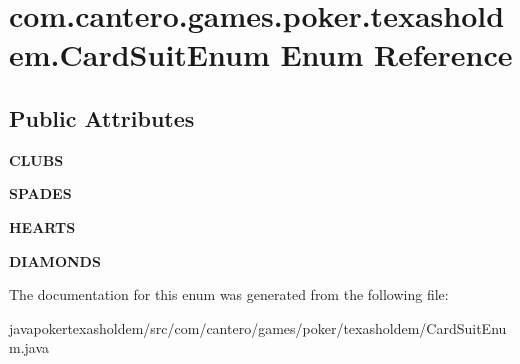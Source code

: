 \hypertarget{enumcom_1_1cantero_1_1games_1_1poker_1_1texasholdem_1_1_card_suit_enum}{}\section{com.\+cantero.\+games.\+poker.\+texasholdem.\+Card\+Suit\+Enum Enum Reference}
\label{enumcom_1_1cantero_1_1games_1_1poker_1_1texasholdem_1_1_card_suit_enum}
\subsection*{Public Attributes}
\begin{DoxyCompactItemize}
\item 
\hypertarget{enumcom_1_1cantero_1_1games_1_1poker_1_1texasholdem_1_1_card_suit_enum_a48741b60994b85639f3da269e31109d2}{}{\bfseries C\+L\+U\+B\+S}\label{enumcom_1_1cantero_1_1games_1_1poker_1_1texasholdem_1_1_card_suit_enum_a48741b60994b85639f3da269e31109d2}

\item 
\hypertarget{enumcom_1_1cantero_1_1games_1_1poker_1_1texasholdem_1_1_card_suit_enum_a7834d5c889846f2fa4422d3e81f2c47b}{}{\bfseries S\+P\+A\+D\+E\+S}\label{enumcom_1_1cantero_1_1games_1_1poker_1_1texasholdem_1_1_card_suit_enum_a7834d5c889846f2fa4422d3e81f2c47b}

\item 
\hypertarget{enumcom_1_1cantero_1_1games_1_1poker_1_1texasholdem_1_1_card_suit_enum_a1efa796ce27179fc0208635a87b7f0df}{}{\bfseries H\+E\+A\+R\+T\+S}\label{enumcom_1_1cantero_1_1games_1_1poker_1_1texasholdem_1_1_card_suit_enum_a1efa796ce27179fc0208635a87b7f0df}

\item 
\hypertarget{enumcom_1_1cantero_1_1games_1_1poker_1_1texasholdem_1_1_card_suit_enum_a19842c52b34a4d057243d0b571e2e0f2}{}{\bfseries D\+I\+A\+M\+O\+N\+D\+S}\label{enumcom_1_1cantero_1_1games_1_1poker_1_1texasholdem_1_1_card_suit_enum_a19842c52b34a4d057243d0b571e2e0f2}

\end{DoxyCompactItemize}


The documentation for this enum was generated from the following file\+:\begin{DoxyCompactItemize}
\item 
javapokertexasholdem/src/com/cantero/games/poker/texasholdem/Card\+Suit\+Enum.\+java\end{DoxyCompactItemize}
